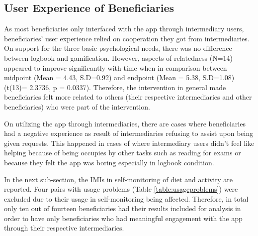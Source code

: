 \subsection{User Experience of Beneficiaries}
As most beneficiaries only interfaced with the app through intermediary users, beneficiaries' user experience relied on cooperation they got from intermediaries. On support for the three basic psychological needs, there was no difference between logbook and gamification. However, aspects of relatedness (N=14) appeared to improve significantly with time when in comparison between midpoint (Mean = 4.43, S.D=0.92) and endpoint (Mean = 5.38, S.D=1.08)(t(13)= 2.3736, p =  0.0337). Therefore, the intervention in general made beneficiaries felt more related to others (their respective intermediaries and other beneficiaries) who were part of the intervention.
  
On utilizing the app through intermediaries, there are cases where beneficiaries had a negative experience as result of intermediaries refusing to assist upon being given requests. This happened in cases of where intermediary users didn't feel like helping because of being occupies by other tasks such as reading for exams or because they felt the app was boring especially in logbook condition. 

In the next sub-section, the IMIs in self-monitoring of diet and activity are reported. Four pairs with usage problems (Table \ref{table:usageproblems}) were excluded due to their usage in self-monitoring being affected. Therefore, in total only ten out of fourteen beneficiaries had their results included for analysis in order to have only beneficiaries who had meaningful engagement with the app through their respective intermediaries.
